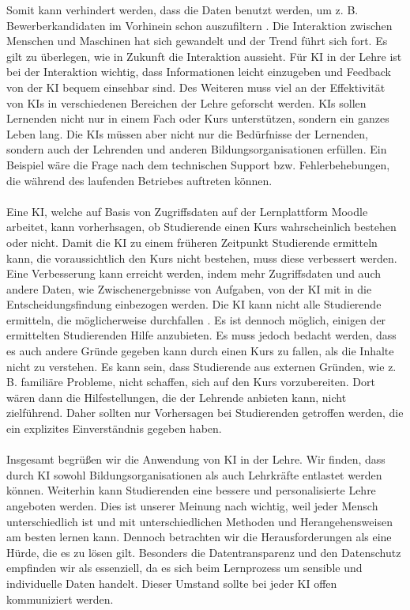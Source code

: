 Somit kann verhindert werden, dass die Daten benutzt werden, um z. B. Bewerberkandidaten im Vorhinein schon auszufiltern \cite[S. 8f]{Pinkwart.2016}.
Die Interaktion zwischen Menschen und Maschinen hat sich gewandelt und der Trend führt sich fort. Es gilt zu überlegen, wie in Zukunft die Interaktion aussieht.
Für KI in der Lehre ist bei der Interaktion wichtig, dass Informationen leicht einzugeben und Feedback von der KI bequem einsehbar sind.
Des Weiteren muss viel an der Effektivität von KIs in verschiedenen Bereichen der Lehre geforscht werden. KIs sollen Lernenden nicht nur in einem Fach oder Kurs unterstützen, sondern ein ganzes Leben lang.
Die KIs müssen aber nicht nur die Bedürfnisse der Lernenden, sondern auch der Lehrenden und anderen Bildungsorganisationen erfüllen.
Ein Beispiel wäre die Frage nach dem technischen Support bzw. Fehlerbehebungen, die während des laufenden Betriebes auftreten können.\cite[S. 10ff]{Pinkwart.2016}
\\
\\ \noindent
Eine KI, welche auf Basis von Zugriffsdaten auf der Lernplattform Moodle arbeitet, kann vorherhsagen, ob Studierende einen Kurs wahrscheinlich bestehen oder nicht.
Damit die KI zu einem früheren Zeitpunkt Studierende ermitteln kann, die voraussichtlich den Kurs nicht bestehen, muss diese verbessert werden.
Eine Verbesserung kann erreicht werden, indem mehr Zugriffsdaten und auch andere Daten, wie Zwischenergebnisse von Aufgaben, von der KI mit in die Entscheidungsfindung einbezogen werden. \cite[S. 14f]{Quinn.2020}
Die KI kann nicht alle Studierende ermitteln, die möglicherweise durchfallen \cite[S. 16]{Quinn.2020}.
Es ist dennoch möglich, einigen der ermittelten Studierenden Hilfe anzubieten. Es muss jedoch bedacht werden, dass es auch andere Gründe gegeben kann durch einen Kurs zu fallen, als die Inhalte nicht zu verstehen.
Es kann sein, dass Studierende aus externen Gründen, wie z. B. familiäre Probleme, nicht schaffen, sich auf den Kurs vorzubereiten.
Dort wären dann die Hilfestellungen, die der Lehrende anbieten kann, nicht zielführend.
Daher sollten nur Vorhersagen bei Studierenden getroffen werden, die ein explizites Einverständnis gegeben haben.
\\
\\
\noindent
Insgesamt begrüßen wir die Anwendung von KI in der Lehre. Wir finden, dass durch KI sowohl Bildungsorganisationen als auch Lehrkräfte entlastet werden können. Weiterhin kann Studierenden eine bessere und personalisierte Lehre angeboten werden. Dies ist unserer Meinung nach wichtig, weil jeder Mensch unterschiedlich ist und mit unterschiedlichen Methoden und Herangehensweisen am besten lernen kann. Dennoch betrachten wir die Herausforderungen als eine Hürde, die es zu lösen gilt. Besonders die Datentransparenz und den Datenschutz empfinden wir als essenziell, da es sich beim Lernprozess um sensible und  individuelle Daten handelt. Dieser Umstand sollte bei jeder KI offen kommuniziert werden.
